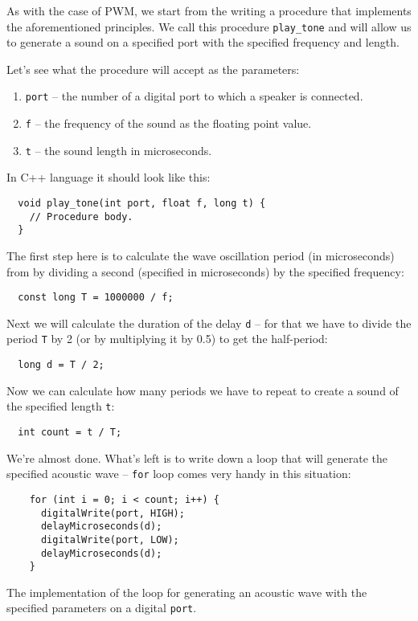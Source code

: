 \documentclass[../sparc.tex]{subfiles}
\begin{document}
As with the case of PWM, we start from the writing a procedure that implements
the aforementioned principles.  We call this procedure \texttt{play\_tone} and
will allow us to generate a sound on a specified port with the specified
frequency and length.

Let's see what the procedure will accept as the parameters:
\begin{enumerate}
\item \texttt{port} -- the number of a digital port to which a speaker is
  connected.
\item \texttt{f} -- the frequency of the sound as the floating point value.
\item \texttt{t} -- the sound length in microseconds.
\end{enumerate}

In C++ language it should look like this:
\begin{verbatim}
  void play_tone(int port, float f, long t) {
    // Procedure body.
  }
\end{verbatim}

The first step here is to calculate the wave oscillation period (in
microseconds) from by dividing a second (specified in microseconds) by the
specified frequency:

\begin{verbatim}
  const long T = 1000000 / f;
\end{verbatim}

Next we will calculate the duration of the delay \texttt{d} -- for that we have
to divide the period \texttt{T} by 2 (or by multiplying it by 0.5) to get the
half-period:

\begin{verbatim}
  long d = T / 2;
\end{verbatim}

Now we can calculate how many periods we have to repeat to create a sound of the
specified length \texttt{t}:

\begin{verbatim}
  int count = t / T;
\end{verbatim}

We're almost done.  What's left is to write down a loop that will generate the
specified acoustic wave -- \texttt{for} loop comes very handy in this situation:

\begin{listing}[H]
  \begin{verbatim}
    for (int i = 0; i < count; i++) {
      digitalWrite(port, HIGH);
      delayMicroseconds(d);
      digitalWrite(port, LOW);
      delayMicroseconds(d);
    }
  \end{verbatim}
  \label{listing:play-tone-cycle}
  \caption{The implementation of the loop for generating an acoustic wave with
    the specified parameters on a digital \texttt{port}.}
\end{listing}
\end{document}
